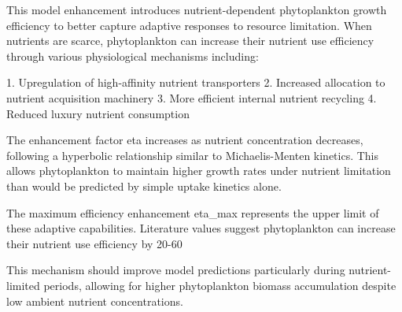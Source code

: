 This model enhancement introduces nutrient-dependent phytoplankton growth efficiency to better capture adaptive responses to resource limitation. When nutrients are scarce, phytoplankton can increase their nutrient use efficiency through various physiological mechanisms including:

1. Upregulation of high-affinity nutrient transporters
2. Increased allocation to nutrient acquisition machinery
3. More efficient internal nutrient recycling
4. Reduced luxury nutrient consumption

The enhancement factor eta increases as nutrient concentration decreases, following a hyperbolic relationship similar to Michaelis-Menten kinetics. This allows phytoplankton to maintain higher growth rates under nutrient limitation than would be predicted by simple uptake kinetics alone.

The maximum efficiency enhancement eta_max represents the upper limit of these adaptive capabilities. Literature values suggest phytoplankton can increase their nutrient use efficiency by 20-60%

This mechanism should improve model predictions particularly during nutrient-limited periods, allowing for higher phytoplankton biomass accumulation despite low ambient nutrient concentrations.
